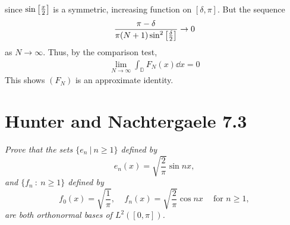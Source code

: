 \documentclass[paper=a4, fontsize=11pt]{scrartcl} %
\theoremstyle{plain}
\numberwithin{equation}{section} %
\numberwithin{figure}{section} %
\numberwithin{table}{section} %
\begin{document}
\begin{enumerate}[\bf (a)]
\begin{align*}
        \end{align*}
        since $\sin\qty[\frac{x}{2}]$ is a symmetric, increasing function on $[\delta, \pi]$.  But the sequence
        \begin{align*}
            \frac{\pi - \delta}{\pi(N+1)\sin^2\qty[\frac{\delta}{2}]} \rightarrow 0
        \end{align*}
        as $N \rightarrow \infty$.  Thus, by the comparison test,
        \begin{align*}
            \lim_{N\rightarrow\infty}\int_\mathbb{D}F_N(x)\dd x = 0
        \end{align*}
        This shows $(F_N)$ is an approximate identity.
\end{enumerate}

\section{Hunter and Nachtergaele 7.3}
\emph{Prove that the sets $\{e_n\ |\ n \geq 1\}$ defined by $$e_n(x) = \sqrt{\frac{2}{\pi}}\sin nx,$$ and $\{f_n\ :\ n \geq 1\}$ defined by $$f_0(x) = \sqrt{\frac{1}{\pi}},\ \ \ \ \ f_n(x) = \sqrt{\frac{2}{\pi}}\cos nx\ \ \ \ \text{ for } n \geq 1,$$ are both orthonormal bases of $L^2([0,\pi])$.} \\
\end{document}
